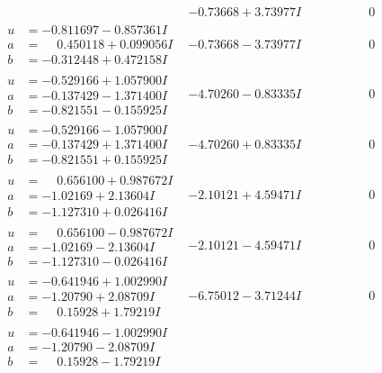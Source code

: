 \documentclass[1p]{elsarticle_modified}
\theoremstyle{definition}
\begin{document}
$$\begin{array}{c|c|c}
 & -0.73668 + 3.73977 I & \phantom{-0.000000 } 0 \\ \hline\begin{aligned}
u &= -0.811697 - 0.857361 I \\
a &= \phantom{-}0.450118 + 0.099056 I \\
b &= -0.312448 + 0.472158 I\end{aligned}
 & -0.73668 - 3.73977 I & \phantom{-0.000000 } 0 \\ \hline\begin{aligned}
u &= -0.529166 + 1.057900 I \\
a &= -0.137429 - 1.371400 I \\
b &= -0.821551 - 0.155925 I\end{aligned}
 & -4.70260 - 0.83335 I & \phantom{-0.000000 } 0 \\ \hline\begin{aligned}
u &= -0.529166 - 1.057900 I \\
a &= -0.137429 + 1.371400 I \\
b &= -0.821551 + 0.155925 I\end{aligned}
 & -4.70260 + 0.83335 I & \phantom{-0.000000 } 0 \\ \hline\begin{aligned}
u &= \phantom{-}0.656100 + 0.987672 I \\
a &= -1.02169 + 2.13604 I \\
b &= -1.127310 + 0.026416 I\end{aligned}
 & -2.10121 + 4.59471 I & \phantom{-0.000000 } 0 \\ \hline\begin{aligned}
u &= \phantom{-}0.656100 - 0.987672 I \\
a &= -1.02169 - 2.13604 I \\
b &= -1.127310 - 0.026416 I\end{aligned}
 & -2.10121 - 4.59471 I & \phantom{-0.000000 } 0 \\ \hline\begin{aligned}
u &= -0.641946 + 1.002990 I \\
a &= -1.20790 + 2.08709 I \\
b &= \phantom{-}0.15928 + 1.79219 I\end{aligned}
 & -6.75012 - 3.71244 I & \phantom{-0.000000 } 0 \\ \hline\begin{aligned}
u &= -0.641946 - 1.002990 I \\
a &= -1.20790 - 2.08709 I \\
b &= \phantom{-}0.15928 - 1.79219 I\end{aligned}

\end{array}$$
\end{document}
